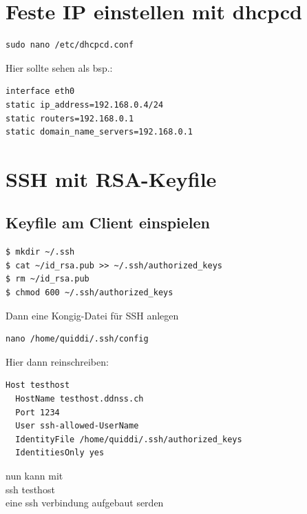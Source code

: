 \documentclass[11pt,fleqn]{book} %
\numberwithin{equation}{section} %
\numberwithin{figure}{section} %
\numberwithin{table}{section} %
\begin{document}
\chapter{Feste IP einstellen mit dhcpcd}
\begin{lstlisting}
sudo nano /etc/dhcpcd.conf
\end{lstlisting}
Hier sollte sehen als bsp.:
\begin{lstlisting}
interface eth0
static ip_address=192.168.0.4/24
static routers=192.168.0.1
static domain_name_servers=192.168.0.1
\end{lstlisting}
\chapter{SSH mit RSA-Keyfile}
\section{Keyfile am Client einspielen}
\begin{lstlisting}
$ mkdir ~/.ssh
$ cat ~/id_rsa.pub >> ~/.ssh/authorized_keys
$ rm ~/id_rsa.pub
$ chmod 600 ~/.ssh/authorized_keys
\end{lstlisting}
Dann eine Kongig-Datei für SSH anlegen
\begin{lstlisting}
nano /home/quiddi/.ssh/config
\end{lstlisting}
Hier dann reinschreiben:
\begin{lstlisting}
Host testhost
  HostName testhost.ddnss.ch
  Port 1234
  User ssh-allowed-UserName
  IdentityFile /home/quiddi/.ssh/authorized_keys
  IdentitiesOnly yes
\end{lstlisting}
nun kann mit\\ 
ssh testhost\\
eine ssh verbindung aufgebaut serden
\end{document}
